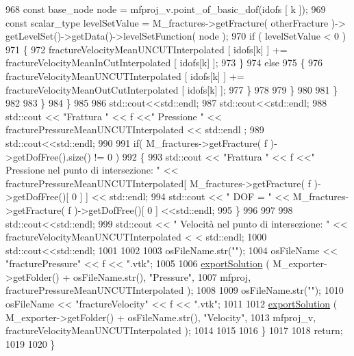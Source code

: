 \begin{DoxyCode}
968                         \textcolor{keyword}{const} base\_node node = mfproj\_v.point\_of\_basic\_dof(idofs [ k ]);
969                         \textcolor{keyword}{const} scalar\_type levelSetValue = M\_fractures->getFracture( otherFracture )->
      getLevelSet()->getData()->levelSetFunction( node );
970                         \textcolor{keywordflow}{if} ( levelSetValue < 0 )
971                         \{
972                             fractureVelocityMeanUNCUTInterpolated [ idofs[k] ] += 
      fractureVelocityMeanInCutInterpolated [ idofs[k] ];
973                         \}
974                         \textcolor{keywordflow}{else}
975                         \{
976                             fractureVelocityMeanUNCUTInterpolated [ idofs[k] ] += 
      fractureVelocityMeanOutCutInterpolated [ idofs[k] ];
977                         \}
978 
979                     \}
980 
981                 \}
982 
983             \}
984         \}
985         
986         std::cout<<std::endl;
987         std::cout<<std::endl;
988         std::cout << \textcolor{stringliteral}{"Frattura "} << f <<\textcolor{stringliteral}{" Pressione "} << fracturePressureMeanUNCUTInterpolated << std::endl
      ;
989         std::cout<<std::endl;
990         
991         \textcolor{keywordflow}{if}( M\_fractures->getFracture( f )->getDofFree().size() != 0 )
992         \{
993             std::cout << \textcolor{stringliteral}{"Frattura "} << f <<\textcolor{stringliteral}{" Pressione nel punto di intersezione: "} << 
      fracturePressureMeanUNCUTInterpolated[ M\_fractures->getFracture( f )->getDofFree()[ 0 ] ] << std::endl;
994             std::cout << \textcolor{stringliteral}{" DOF =  "} << M\_fractures->getFracture( f )->getDofFree()[ 0 ] <<std::endl;
995         \}
996         
997         
998             std::cout<<std::endl;
999             std::cout << \textcolor{stringliteral}{" Velocità nel punto di intersezione: "} << fractureVelocityMeanUNCUTInterpolated <
      < std::endl;
1000             std::cout<<std::endl;
1001         
1002     
1003         osFileName.str(\textcolor{stringliteral}{""});
1004         osFileName << \textcolor{stringliteral}{"fracturePressure"} << f << \textcolor{stringliteral}{".vtk"};
1005 
1006         \hyperlink{UsefulFunctions_8h_add7b8b88dc68d93addd88b9a4dc6e8bf}{exportSolution} ( M\_exporter->getFolder() + osFileName.str(), \textcolor{stringliteral}{"Pressure"},
1007                      mfproj, fracturePressureMeanUNCUTInterpolated );
1008         
1009         osFileName.str(\textcolor{stringliteral}{""});
1010         osFileName << \textcolor{stringliteral}{"fractureVelocity"} << f << \textcolor{stringliteral}{".vtk"};
1011         
1012         \hyperlink{UsefulFunctions_8h_add7b8b88dc68d93addd88b9a4dc6e8bf}{exportSolution} ( M\_exporter->getFolder() + osFileName.str(), \textcolor{stringliteral}{"Velocity"},
1013                      mfproj\_v, fractureVelocityMeanUNCUTInterpolated );
1014 
1015         
1016     \}
1017 
1018     \textcolor{keywordflow}{return};   
1019    
1020 \}
\end{DoxyCode}


